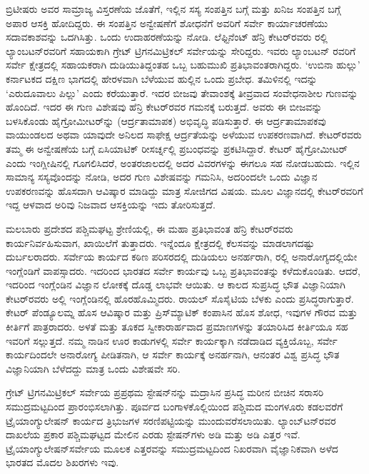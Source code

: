 ಬ್ರಿಟೀಷರು ಅವರ ಸಾಮ್ರಾಜ್ಯ ವಿಸ್ತರಣೆಯ ಜೊತೆಗೆ, ಇಲ್ಲಿನ ಸಸ್ಯ ಸಂಪತ್ತಿನ ಬಗ್ಗೆ ಮತ್ತು ಖನಿಜ ಸಂಪತ್ತಿನ ಬಗ್ಗೆ ಅಪಾರ ಆಸಕ್ತಿ ಹೋದಿದ್ದರು. ಈ ಸಂಪತ್ತಿನ ಅನ್ವೇಷಣೆಗೆ ಶೋಧನೆಗೆ ಅವರಿಗೆ ಸರ್ವೇ ಕಾರ್ಯಾಚರಣೆಯು ಸದಾವಕಾಶವನ್ನು ಒದಗಿಸಿತ್ತು. ಒಂದು ಉದಾಹರಣೆಯನ್ನು ನೋಡಿ. ಲೆಫ್ಟಿನೆಂಟ್​ ಹೆನ್ರಿ ಕೇಟರ್​ರವರು  ರಲ್ಲಿ ಲ್ಯಾಂಬಟನ್​ರವರಿಗೆ ಸಹಾಯಕಾಗಿ ಗ್ರೇಟ್​ ಟ್ರಿಗನಮಿಟ್ರಿಕಲ್​ ಸರ್ವೇಯನ್ನು ಸೇರಿದ್ದರು. ಇವರು ಲ್ಯಾಂಬಟನ್​ ರವರಿಗೆ ಸರ್ವೇ ಕ್ಷೇತ್ರದಲ್ಲಿ ಸಹಾಯಕರಾಗಿ ದುಡಿಯುತಿದ್ದಂತಹ ಒಬ್ಬ ಬಹುಮುಖಿ ಪ್ರತಿಭಾವಂತರಾಗಿದ್ದರು. ‘ಉಬಿನಾ ಹುಲ್ಲು’ ಕರ್ನಾಟಕದ ದಕ್ಷಿಣ ಭಾಗದಲ್ಲಿ ಹೇರಳವಾಗಿ ಬೆಳೆಯುವ ಹುಲ್ಲಿನ ಒಂದು ಪ್ರಬೇಧ. ತಮಿಳಿನಲ್ಲಿ ಇದನ್ನು ‘ಎರುದೂವಾಲು ಪಿಲ್ಲು’ ಎಂದು ಕರೆಯುತ್ತಾರೆ. ಇದರ ಬೀಜವು ತೇವಾಂಶಕ್ಕೆ ತೀವ್ರವಾದ ಸಂವೇಧನಾಶೀಲ ಗುಣವನ್ನು ಹೊಂದಿದೆ. ಇದರ ಈ ಗುಣ ವಿಶೇಷವು ಹೆನ್ರಿ ಕೇಟರ್​ರವರ ಗಮನಕ್ಕೆ ಬರುತ್ತದೆ. ಅವರು ಈ ಬೀಜವನ್ನು ಬಳಸಿಕೊಂಡು ಹೈಗ್ರೋಮೀಟರ್​ನ್ನು (ಆರ್ದ್ರತಾಮಾಪಕ) ಅಭಿವೃದ್ಧಿ ಪಡಿಸುತ್ತಾರೆ. ಈ ಆರ್ದ್ರತಾಮಾಪಕವು ವಾಯುಂಡಲದ ಅಥವಾ ಯಾವುದೇ ಅನಿಲದ ಸಾಫೇಕ್ಷ ಆರ್ದ್ರತೆಯನ್ನು ಅಳೆಯುವ ಉಪಕರಣವಾಗಿದೆ. ಕೇಟರ್​ರವರು ತಮ್ಮ ಈ ಅನ್ವೇಷಣೆಯ ಬಗ್ಗೆ ಏಸಿಯಾಟಿಕ್​ ರೀಸರ್ಚ್ನಲ್ಲಿ ಪ್ರಬಂಧವನ್ನು ಪ್ರಕಟಿಸಿದ್ದಾರೆ. ಕೇಟರ್​ ಹೈಗ್ರೋಮೀಟರ್​ ಎಂದು ಇಂಗ್ಲೀಷಿನಲ್ಲಿ ಗೂಗಲಿಸಿದರೆ, ಅಂತರಜಾಲದಲ್ಲಿ ಅದರ ವಿವರಗಳನ್ನು ಈಗಲೂ ಸಹ ನೋಡಬಹುದು. ಇಲ್ಲಿನ ಸಾಮಾನ್ಯ ಸಸ್ಯವೊಂದನ್ನು ನೋಡಿ, ಅದರ ಗುಣ ವಿಶೇಷವನ್ನು ಗಮನಿಸಿ, ಅದರಿಂದಲೇ ಒಂದು ವಿಜ್ಞಾನ ಉಪಕರಣವನ್ನು ಹೊಸದಾಗಿ ಆವಿಷ್ಕಾರ ಮಾಡಿದ್ದು ಮಾತ್ರ ಸೋಜಿಗದ ವಿಷಯ. ಮೂಲ ವಿಜ್ಞಾನದಲ್ಲಿ ಕೇಟರ್​ರವರಿಗೆ ಇದ್ದ ಆಳವಾದ ಅರಿವು ನಿಜವಾದ ಆಸಕ್ತಿಯನ್ನು ಇದು ತೋರಿಸುತ್ತದೆ.

ಮಲಬಾರು ಪ್ರದೇಶದ ಪಶ್ಚಿಮಘಟ್ಟ ಶ್ರೇಣಿಯಲ್ಲಿ, ಈ ಮಹಾ ಪ್ರತಿಭಾವಂತ ಹೆನ್ರಿ ಕೇಟರ್​ರವರು ಕಾರ್ಯನಿರ್ವಹಿಸುವಾಗ, ಖಾಯಿಲೆಗೆ ತುತ್ತಾದರು. ಇನ್ನೆಂದೂ ಕ್ಷೇತ್ರದಲ್ಲಿ ಕೆಲಸವನ್ನು ಮಾಡಲಾಗದಷ್ಟು ದುರ್ಬಲರಾದರು. ಸರ್ವೇಯ ಕಾರ್ಯದ ಕಠಿಣ ಪರಿಸರದಲ್ಲಿ ದುಡಿಯಲು ಅನರ್ಹರಾಗಿ,  ರಲ್ಲಿ ಅನಾರೋಗ್ಯದಲ್ಲಿಯೇ ಇಂಗ್ಲೆಂಡಿಗೆ ವಾಪಸ್ಸಾದರು. ಇದರಿಂದ ಭಾರತದ ಸರ್ವೇ ಕಾರ್ಯವು ಒಬ್ಬ ಪ್ರತಿಭಾವಂತನ್ನು ಕಳೆದುಕೊಂಡಿತು. ಆದರೆ, ಇದರಿಂದ ಇಂಗ್ಲೆಂಡಿನ ವಿಜ್ಞಾನ ಲೋಕಕ್ಕೆ ದೊಡ್ಡ ಲಾಭವೇ ಆಯಿತು. ಆ ಕಾಲದ ಸುಪ್ರಸಿದ್ಧ ಭೌತ ವಿಜ್ಞಾನಿಯಾಗಿ ಕೇಟರ್​ರವರು ಅಲ್ಲಿ ಇಂಗ್ಲೆಂಡಿನಲ್ಲಿ ಹೊರಹೊಮ್ಮಿದರು. ರಾಯಲ್​ ಸೊಸೈಟಿಯ ಬೆಳಕು ಎಂದು ಪ್ರಸಿದ್ಧರಾಗುತ್ತಾರೆ. ಕೇಟರ್​ ಪೆಂಡ್ಯೂಲಮ್ನ ಹೊಸ ಆವಿಷ್ಕಾರ ಮತ್ತು ಪ್ರಿಸ್​ಮ್ಯಾಟಿಕ್​ ಕಂಪಾಸಿನ ಹೊಸ ಶೋಧ, ಇವುಗಳ ಗೌರವ ಮತ್ತು ಕೀರ್ತಿಗೆ ಪಾತ್ರರಾದರು. ಅಳತೆ ಮತ್ತು ತೂಕದ ಸ್ವೀಕಾರಾರ್ಹವಾದ ಪ್ರಮಾಣಗಳನ್ನು ತಯಾರಿಸಿದ ಕೀರ್ತಿಯೂ ಸಹ ಇವರಿಗೆ ಸಲ್ಲುತ್ತದೆ. ನಮ್ಮ ನಾಡಿನ ಊರ ಕಾಡುಗಳಲ್ಲಿ ಸರ್ವೇ ಕಾರ್ಯಕ್ಕಾಗಿ ನಡೆದಾಡಿದ ವ್ಯಕ್ತಿಯೊಬ್ಬ, ಸರ್ವೇ ಕಾರ್ಯದಿಂದಲೇ ಅನಾರೋಗ್ಯ ಪೀಡಿತನಾಗಿ, ಆ ಸರ್ವೇ ಕಾರ್ಯಕ್ಕೆ ಅನರ್ಹನಾಗಿ, ಆನಂತರ ವಿಶ್ವ ಪ್ರಸಿದ್ಧ ಭೌತ ವಿಜ್ಞಾನಿಯಾಗಿ ಬೆಳೆದದ್ದು ಮಾತ್ರ ಒಂದು ವಿಶೇಷವೇ ಸರಿ.

ಗ್ರೇಟ್​ ಟ್ರಿಗನಮಿಟ್ರಿಕಲ್​ ಸರ್ವೇಯ ಪ್ರಪ್ರಥಮ ಸ್ಟೇಷನ್​ನನ್ನು ಮದ್ರಾಸಿನ ಪ್ರಸಿದ್ಧ ಮರೀನ ಬೀಚಿನ ಸರಾಸರಿ ಸಮುದ್ರಮಟ್ಟದಿಂದ ಪ್ರಾರಂಭಿಸಲಾಗಿತ್ತು. ಪೂರ್ವದ ಬಂಗಾಳಕೊಲ್ಲಿಯಿಂದ ಪಶ್ಚಿಮದ ಮಂಗಳೂರು ಕಡಲವರೆಗೆ ಟ್ರೈಯಾಂಗ್ಯುಲೇಷನ್​ ಕಾರ್ಯದ ತ್ರಿಭುಜಗಳ ಸರಣಿಪಟ್ಟಿಯನ್ನು ಮುಂದುವರೆಸಲಾಯಿತು. ಲ್ಯಾಂಬ್​ಟನ್​ರವರ ದಾಖಲೆಯ ಪ್ರಕಾರ ಪಶ್ಚಿಮಘಟ್ಟದ ಮೇಲಿನ ಎರಡು ಸ್ಟೇಷನ್​ಗಳು  ಅಡಿ ಮತ್ತು  ಅಡಿ ಎತ್ತರ ಇವೆ. ಟ್ರೈಯಾಂಗ್ಯುಲೇಷನ್​ ಸರ್ವೇಯ ಮೂಲಕ ಎತ್ತರವನ್ನು ಸಮುದ್ರಮಟ್ಟದಿಂದ ನಿಖರವಾಗಿ ವೈಜ್ಞಾನಿಕವಾಗಿ ಅಳೆದ ಭಾರತದ ಮೊದಲ ಶಿಖರಗಳು ಇವು.


